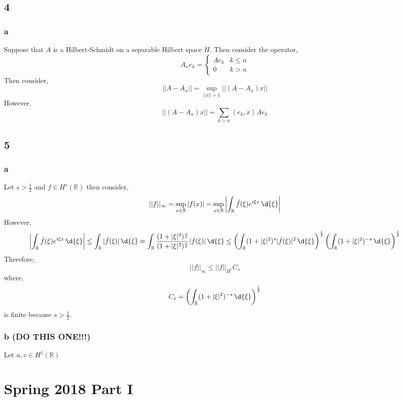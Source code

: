 \documentclass[12pt]{article}
\newcommand{\inner}[2]{\left< #1, #2 \right>}
\newcommand{\R}{\mathbb{R}}
\begin{document}
\subsection{4}

\subsubsection{a}

Suppose that $A$ is a Hilbert-Schmidt on a separable Hilbert space $H$. Then consider the operator,
\[ A_n e_k = 
\begin{cases}
A e_k & k \le n
\\
0 & k > n
\end{cases} \]
Then consider,
\[ || A - A_n || = \sup_{|| x || = 1} || (A - A_n) x || \]
However,
\[ || (A - A_n) x || = \sum_{k > n} \inner{e_k}{x} A e_k \]

\subsection{5}

\subsubsection{a}

Let $s > \frac{1}{2}$ and $f \in H^s(\R)$ then consider,
\[ || f ||_{\infty} = \sup_{x \in \R} |f(x)| = \sup_{x \in \R} \left| \int_\R \hat{f}(\xi) e^{i \xi x} \, \d{\xi} \right| \]
However,
\begin{align*}
\left| \int_\R \hat{f}(\xi) e^{i \xi x} \, \d{\xi} \right| \le \int_\R | \hat{f}(\xi) | \, \d{\xi} = \int_{\R} \frac{(1 + |\xi|^2)^{\frac{s}{2}}}{(1 + |\xi|^2)^{\frac{s}{2}}} | \hat{f}(\xi) | \, \d{\xi} \le \left( \int_{\R} (1 + | \xi |^2)^s | \hat{f}(\xi) |^2 \, \d{\xi} \right)^{\frac{1}{2}} \left( \int_{\R} (1 + |\xi|^2)^{-s} \, \d{\xi} \right)^{\frac{1}{2}}
\end{align*}
Therefore,
\[ || f ||_{\infty} \le || f ||_{H^s} C_s \]
where,
\[ C_s = \left( \int_{\R} (1 + |\xi|^2)^{-s} \, \d{\xi} \right)^{\frac{1}{2}} \]
is finite because $s > \frac{1}{2}$. 

\subsubsection{b (DO THIS ONE!!!)}

Let $u,v \in H^1(\R)$

\section{Spring 2018 Part I}
\end{document}
